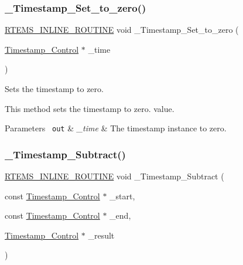 \subsubsection{\texorpdfstring{\_Timestamp\_Set\_to\_zero()}{\_Timestamp\_Set\_to\_zero()}}
{\footnotesize\ttfamily \mbox{\hyperlink{group__RTEMSScoreBaseDefs_gac216239df231d5dbd15e3520b0b9313f}{R\+T\+E\+M\+S\+\_\+\+I\+N\+L\+I\+N\+E\+\_\+\+R\+O\+U\+T\+I\+NE}} void \+\_\+\+Timestamp\+\_\+\+Set\+\_\+to\+\_\+zero (\begin{DoxyParamCaption}\item[{\mbox{\hyperlink{group__SuperCoreTimeStamp_ga8508036506d5211c98844c88045e2410}{Timestamp\+\_\+\+Control}} $\ast$}]{\+\_\+time }\end{DoxyParamCaption})}



Sets the timestamp to zero. 

This method sets the timestamp to zero. value.


\begin{DoxyParams}[1]{Parameters}
\mbox{\texttt{ out}}  & {\em \+\_\+time} & The timestamp instance to zero. \\
\hline
\end{DoxyParams}
\mbox{\label{group__SuperCoreTimeStamp_gadc45a1a25f125cdc3c1dcdb4cd86b4cc}} 
\subsubsection{\texorpdfstring{\_Timestamp\_Subtract()}{\_Timestamp\_Subtract()}}
{\footnotesize\ttfamily \mbox{\hyperlink{group__RTEMSScoreBaseDefs_gac216239df231d5dbd15e3520b0b9313f}{R\+T\+E\+M\+S\+\_\+\+I\+N\+L\+I\+N\+E\+\_\+\+R\+O\+U\+T\+I\+NE}} void \+\_\+\+Timestamp\+\_\+\+Subtract (\begin{DoxyParamCaption}\item[{const \mbox{\hyperlink{group__SuperCoreTimeStamp_ga8508036506d5211c98844c88045e2410}{Timestamp\+\_\+\+Control}} $\ast$}]{\+\_\+start,  }\item[{const \mbox{\hyperlink{group__SuperCoreTimeStamp_ga8508036506d5211c98844c88045e2410}{Timestamp\+\_\+\+Control}} $\ast$}]{\+\_\+end,  }\item[{\mbox{\hyperlink{group__SuperCoreTimeStamp_ga8508036506d5211c98844c88045e2410}{Timestamp\+\_\+\+Control}} $\ast$}]{\+\_\+result }\end{DoxyParamCaption})}




